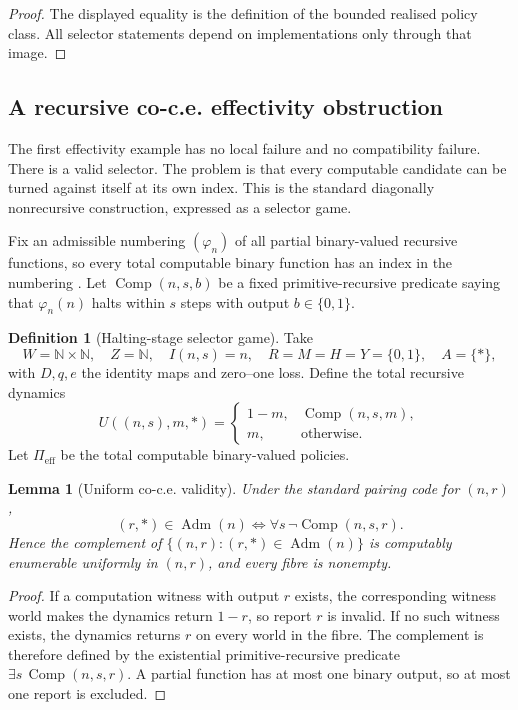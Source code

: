 \documentclass[11pt]{article}
\theoremstyle{plain}
\newtheorem{lemma}[theorem]{Lemma}
\theoremstyle{definition}
\newtheorem{definition}[theorem]{Definition}
\theoremstyle{remark}
\newcommand{\N}{\mathbb{N}}
\newcommand{\Adm}{\operatorname{Adm}}
\begin{document}
\begin{proof}
The displayed equality is the definition of the bounded realised policy class.
All selector statements depend on implementations only through that image.
\end{proof}

\subsection{A recursive co-c.e. effectivity obstruction}

The first effectivity example has no local failure and no compatibility failure.
There is a valid selector. The problem is that every computable candidate can be
turned against itself at its own index. This is the standard diagonally
nonrecursive construction, expressed as a selector game.

Fix an admissible numbering $(\varphi_n)$ of all partial binary-valued recursive
functions, so every total computable binary function has an index in the
numbering \cite{rogers}. Let $\operatorname{Comp}(n,s,b)$ be a fixed
primitive-recursive predicate saying that $\varphi_n(n)$ halts within $s$ steps
with output $b\in\{0,1\}$.

\begin{definition}[Halting-stage selector game]\label{def:Kgame}
Take
\[
W=\N\times\N,\quad Z=\N,\quad I(n,s)=n,
\quad R=M=H=Y=\{0,1\},\quad A=\{\ast\},
\]
with $D,q,e$ the identity maps and zero--one loss. Define the total recursive
dynamics
\[
U((n,s),m,\ast)=
\begin{cases}
1-m,&\operatorname{Comp}(n,s,m),\\
m,&\text{otherwise}.
\end{cases}
\]
Let $\Pi_{\mathrm{eff}}$ be the total computable binary-valued policies.
\end{definition}

\begin{lemma}[Uniform co-c.e. validity]\label{lem:Kfibres}
Under the standard pairing code for $(n,r)$,
\[
(r,\ast)\in\Adm(n)
\iff
\forall s\,\neg\operatorname{Comp}(n,s,r).
\]
Hence the complement of
$\{(n,r):(r,\ast)\in\Adm(n)\}$ is computably enumerable uniformly in
$(n,r)$, and every fibre is nonempty.
\end{lemma}

\begin{proof}
If a computation witness with output $r$ exists, the corresponding witness world
makes the dynamics return $1-r$, so report $r$ is invalid. If no such witness
exists, the dynamics returns $r$ on every world in the fibre. The complement is
therefore defined by the existential primitive-recursive predicate
$\exists s\,\operatorname{Comp}(n,s,r)$. A partial function has at most one
binary output, so at most one report is excluded.
\end{proof}
\end{document}
